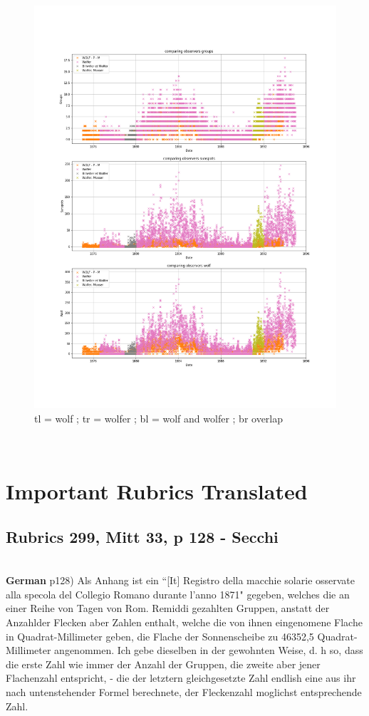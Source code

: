\documentclass[12pt]{article}
\begin{document}
\begin{figure}[H]
    \includegraphics[width=0.5\linewidth]{wolf_and_wolfer_overlap.png}
    \caption{tl = wolf ; tr = wolfer ; bl = wolf and wolfer ; br overlap}
    \label{fig:wolf and wolfer initial plots}
\end{figure}\\


\newpage

\section{Important Rubrics Translated}\label{converting the `aire'}

\subsection{Rubrics 299, Mitt 33, p 128 - Secchi}\label{rubrics 299, secchi}\\

\textbf{German}
p128) Als Anhang ist ein ``[It] Registro della macchie solarie osservate alla specola del Collegio Romano durante l'anno 1871" gegeben, welches die an einer Reihe von Tagen von Rom. Remiddi gezahlten Gruppen, anstatt der Anzahlder Flecken aber Zahlen enthalt, welche die von ihnen eingenomene Flache in Quadrat-Millimeter geben, die Flache der Sonnenscheibe zu 46352,5 Quadrat-Millimeter angenommen. Ich gebe dieselben in der gewohnten Weise, d. h so, dass die erste Zahl wie immer der Anzahl der Gruppen, die zweite aber jener Flachenzahl entspricht, - die der letztern gleichgesetzte Zahl endlish eine aus ihr nach untenstehender Formel berechnete, der Fleckenzahl moglichst entsprechende Zahl.\\
\end{document}
